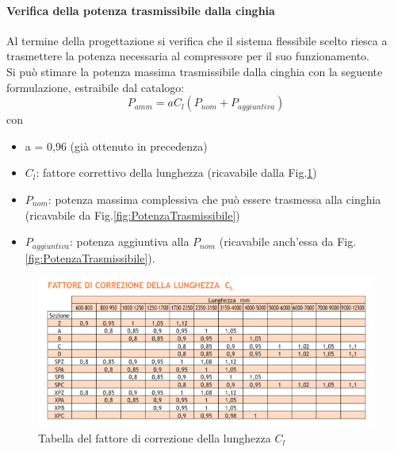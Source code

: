 \paragraph{Verifica della potenza trasmissibile dalla cinghia} Al termine della progettazione si verifica che il sistema flessibile scelto riesca a trasmettere la potenza necessaria al compressore per il suo funzionamento. \\
Si può stimare la potenza massima trasmissibile dalla cinghia con la seguente formulazione, estraibile dal catalogo: 
\begin{equation}
    P_{amm}=a{C}_{l}\left(P_{nom}+P_{aggiuntiva}\right)
\end{equation}
con
\begin{itemize}
    \item a = 0,96 (già ottenuto in precedenza) 
    \item $C_l$: fattore correttivo della lunghezza (ricavabile dalla Fig.\ref{fig:FattoreDiCorrezioneDellaLunghezza}) 
    \item $P_{nom}$: potenza massima complessiva che può essere trasmessa alla cinghia (ricavabile da Fig.\ref{fig:PotenzaTrasmissibile})
    \item $P_{aggiuntiva}$: potenza aggiuntiva alla $P_{nom}$ (ricavabile anch’essa da Fig.\ref{fig:PotenzaTrasmissibile}).
\end{itemize}
\begin{figure}[h]
    \centering
    \includegraphics[scale=0.7]{Immagini/FattoreDiCorrezioneDellaLunghezza.png}
    \caption{Tabella del fattore di correzione della lunghezza $C_l$}
    \label{fig:FattoreDiCorrezioneDellaLunghezza}
\end{figure}

